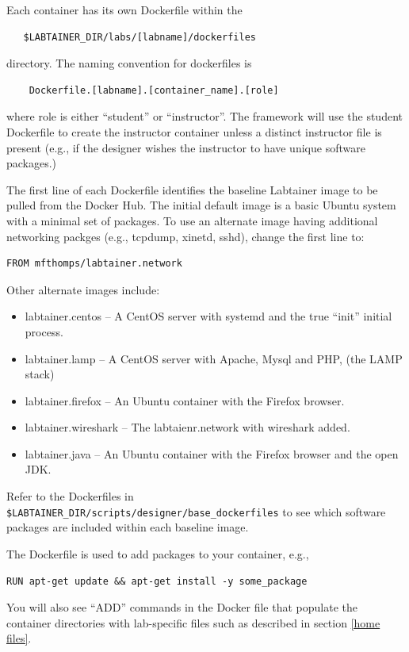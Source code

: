 \documentclass[12pt]{article}
\begin{document}
\noindent Each container has its own Dockerfile within the 
\begin{verbatim}
   $LABTAINER_DIR/labs/[labname]/dockerfiles
\end{verbatim}
\noindent directory.  The naming convention for dockerfiles is
\begin{verbatim}
    Dockerfile.[labname].[container_name].[role]
\end{verbatim}
where role is either ``student'' or ``instructor''.  The framework will use the student Dockerfile to
create the instructor container unless a distinct instructor file is present (e.g., if the designer
wishes the instructor to have unique software packages.) 

The first line of each Dockerfile identifies the baseline Labtainer image to be pulled from the Docker Hub.
The initial default image is a basic Ubuntu system with a minimal set of packages.  To use an
alternate image having additional networking packges (e.g., tcpdump, xinetd, sshd), change the first line to:
\begin{verbatim}
FROM mfthomps/labtainer.network
\end{verbatim}
\noindent Other alternate images include:
\begin{itemize}
\item labtainer.centos -- A CentOS server with systemd and the true ``init'' initial process.
\item labtainer.lamp -- A CentOS server with Apache, Mysql and PHP, (the LAMP stack)
\item labtainer.firefox -- An Ubuntu container with the Firefox browser.
\item labtainer.wireshark -- The labtaienr.network with wireshark added.
\item labtainer.java -- An Ubuntu container with the Firefox browser and the open JDK.
\end{itemize}
Refer to the Dockerfiles in {\tt \$LABTAINER\_DIR/scripts/designer/base\_dockerfiles} to see which
software packages are included within each baseline image. 

The Dockerfile is used to add packages to your container, e.g., 
\begin{verbatim}
RUN apt-get update && apt-get install -y some_package
\end{verbatim}

You will also see ``ADD'' commands in the Docker file that populate the container
directories with lab-specific files such as described in section \ref{home files}.
\end{document}
